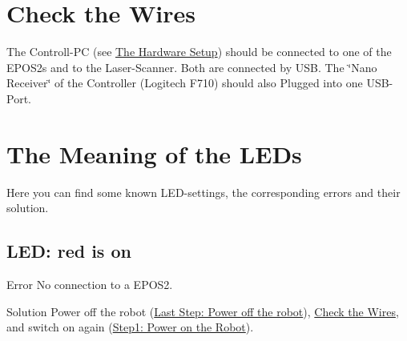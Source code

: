 \hypertarget{troubleshooting_checkWires}{}\section{Check the Wires}\label{troubleshooting_checkWires}
The Controll-\/\-P\-C (see \hyperlink{index_hw_setup}{The Hardware Setup}) should be connected to one of the E\-P\-O\-S2s and to the Laser-\/\-Scanner. Both are connected by U\-S\-B. The \char`\"{}\-Nano Receiver\char`\"{} of the Controller (Logitech F710) should also Plugged into one U\-S\-B-\/\-Port.\hypertarget{troubleshooting_checkLEDs}{}\section{The Meaning of the L\-E\-Ds}\label{troubleshooting_checkLEDs}
Here you can find some known L\-E\-D-\/settings, the corresponding errors and their solution.\hypertarget{troubleshooting_no_connection}{}\subsection{L\-E\-D\-: red is on}\label{troubleshooting_no_connection}
\begin{DoxyParagraph}{Error}
No connection to a E\-P\-O\-S2. 
\end{DoxyParagraph}
\begin{DoxyParagraph}{Solution}
Power off the robot (\hyperlink{start_power_off}{Last Step\-: Power off the robot}), \hyperlink{troubleshooting_checkWires}{Check the Wires}, and switch on again (\hyperlink{start_start_step1}{Step1\-: Power on the Robot}). 
\end{DoxyParagraph}
